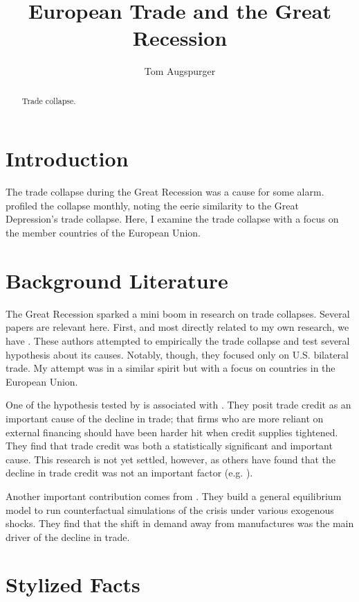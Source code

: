 \documentclass[11pt]{article}
\title{European Trade and the Great Recession}
\author{Tom Augspurger}
\date{}
\begin{document}
\maketitle
\begin{abstract}
  Trade collapse.
\end{abstract}
\section{Introduction}
\label{sec:introduction}

  The trade collapse during the Great Recession was a cause for some alarm.  \cite{eichengreen_orourke:2010} profiled the collapse monthly, noting the eerie similarity to the Great Depression's trade collapse.  Here, I examine the trade collapse with a focus on the member countries of the European Union.

\section{Background Literature}
\label{sec:background_literature}
  The Great Recession sparked a mini boom in research on trade collapses.  Several papers are relevant here.  First, and most directly related to my own research, we have \cite{llt:2010}.  These authors attempted to empirically the trade collapse and test several hypothesis about its causes.  Notably, though, they focused only on U.S. bilateral trade.  My attempt was in a similar spirit but with a focus on countries in the European Union.

  One of the hypothesis tested by \cite{llt:2010} is associated with \cite{chor-manova:2012}. They posit trade credit as an important cause of the decline in trade; that firms who are more reliant on external financing should have been harder hit when credit supplies tightened.  They find that trade credit was both a statistically significant and important cause.  This research is not yet settled, however, as others have found that the decline in trade credit was not an important factor (e.g. \cite{RePEc:imf:imfwpa:11/16}).

  Another important contribution comes from \cite{eaton-kortum-neiman-romalis:2011}.  They build a general equilibrium model to run counterfactual simulations of the crisis under various exogenous shocks.  They find that the shift in demand away from manufactures was the main driver of the decline in trade.
\section{Stylized Facts} %
\label{sec:stylized_facts}
\end{document}
